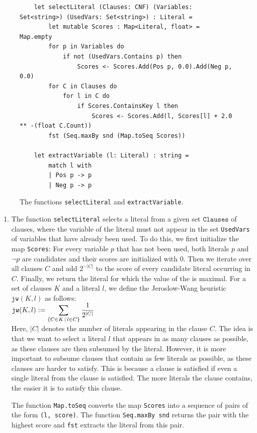 \begin{figure}[!ht]
  \centering
\begin{verbatim}
    let selectLiteral (Clauses: CNF) (Variables: Set<string>) (UsedVars: Set<string>) : Literal =
        let mutable Scores : Map<Literal, float> = Map.empty
        for p in Variables do
            if not (UsedVars.Contains p) then
                Scores <- Scores.Add(Pos p, 0.0).Add(Neg p, 0.0)
        for C in Clauses do
            for l in C do
                if Scores.ContainsKey l then
                    Scores <- Scores.Add(l, Scores[l] + 2.0 ** -(float C.Count))
        fst (Seq.maxBy snd (Map.toSeq Scores))

    let extractVariable (l: Literal) : string =
        match l with
        | Pos p -> p
        | Neg p -> p
\end{verbatim}
\vspace*{-0.3cm}
  \caption{The functions \texttt{selectLiteral} and \texttt{extractVariable}.}
  \label{fig:solve-aux}
\end{figure}
\begin{enumerate}
\item The function \texttt{selectLiteral} selects a literal from 
a given set $\texttt{Clauses}$ of clauses, where the variable of the literal must not appear in the set
\texttt{UsedVars} of variables that have already been used.
To do this, we first initialize the map \texttt{Scores}: For every variable $p$ that has not been used, both
literals $p$ and $\neg p$ are candidates and their scores are initialized with $0$.  Then we iterate over all
clauses $C$ and add $2^{-|C|}$ to the score of every candidate literal occurring in $C$.  Finally, we return the
literal for which the value of the
  \cite{jeroslow:1990} is maximal. For a
set of clauses $K$ and a 
literal $l$, we define the Jeroslow-Wang heuristic $\texttt{jw}(K, l)$ as follows:
\\[0.2cm]
\hspace*{1.3cm}
$\displaystyle\mathtt{jw}(K, l) := \sum\limits_{\{C \in K \,\mid\, l \in C\}} \frac{1}{2^{|C|}}$
\\[0.2cm]
Here, $|C|$ denotes the number of literals appearing in the clause $C$. The idea is that we
want to select a literal $l$ that appears in as many clauses as possible, as these clauses are then
subsumed by the literal. However, it is more important to subsume clauses that contain as few
literals as possible, as these clauses are harder to satisfy. This is because a clause
is satisfied if even a single literal from the clause is satisfied. The more literals the
clause contains, the easier it is to satisfy this clause.

The function \texttt{Map.toSeq} converts the map \texttt{Scores} into a sequence of pairs of the form
\texttt{(l, score)}.  The function \texttt{Seq.maxBy snd} returns the pair with the highest score and \texttt{fst}
extracts the literal from this pair.
\end{enumerate}
